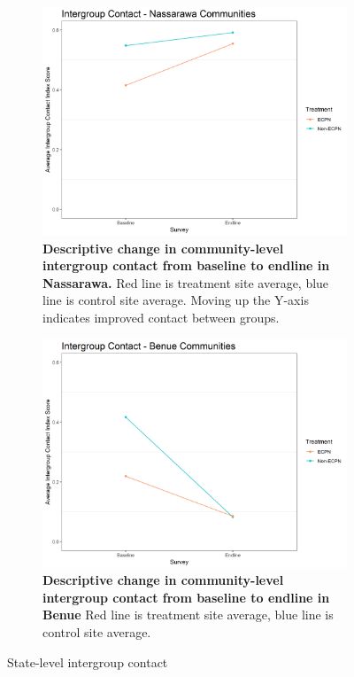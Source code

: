 \documentclass[11pt]{article}
\begin{document}
\begin{figure}[H]
    \begin{subfigure}[b]{.48\textwidth}
    \centering
        \includegraphics[width=\linewidth]{../../../figs/conComm_plot_nas.png}
        \caption{\textbf{Descriptive change in community-level intergroup contact from baseline to endline in Nassarawa.} Red line is treatment site average, blue line is control site average.  Moving up the Y-axis indicates improved contact between groups.}
        \label{fig:con_nas}
    \end{subfigure}
    \hfill
    \begin{subfigure}[b]{.48\textwidth}
    \centering
        \includegraphics[width=\linewidth]{../../../figs/conComm_plot_ben.png}
        \caption{\textbf{Descriptive change in community-level intergroup contact from baseline to endline in Benue} Red line is treatment site average, blue line is control site average.}
        \label{fig:con_ben}
    \end{subfigure}
    \caption{State-level intergroup contact}
\end{figure}
\end{document}

